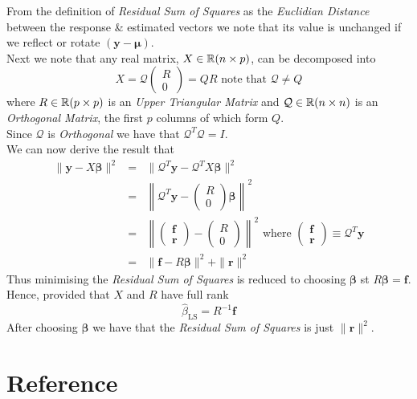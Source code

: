 \documentclass[11pt,a4paper]{article}
\begin{document}
From the definition of \textit{Residual Sum of Squares} as the \textit{Euclidian Distance} between the response \& estimated vectors we note that its value is unchanged if we reflect or rotate $(\textbf{y}-\pmb\mu)$.\\
Next we note that any real matrix, $X\in\mathbb{R}(n\times p)$, can be decomposed into
$$X=\mathcal{Q}\begin{pmatrix}R\\0\end{pmatrix}=QR\text{ note that }\mathcal{Q}\neq Q$$
where $R\in\mathbb{R}(p\times p)$ is an \textit{Upper Triangular Matrix} and $\mathcal{Q}\in\mathbb{R}(n\times n)$ is an \textit{Orthogonal Matrix}, the first $p$ columns of which form $Q$.\\
Since $\mathcal{Q}$ is \textit{Orthogonal} we have that $\mathcal{Q}^T\mathcal{Q}=I$.\\
We can now derive the result that
\[\begin{array}{rcl}
\|\textbf{y}-X\pmb\beta\|^2&=&\|\mathcal{Q}^T\textbf{y}-\mathcal{Q}^TX\pmb\beta\|^2\\
&=&\left\|\mathcal{Q}^T\textbf{y}-\begin{pmatrix}R\\0\end{pmatrix}\pmb\beta\right\|^2\\
&=&\left\|\begin{pmatrix}\textbf{f}\\\textbf{r}\end{pmatrix}-\begin{pmatrix}R\\0\end{pmatrix}\right\|^2\text{ where }\begin{pmatrix}\textbf{f}\\\textbf{r}\end{pmatrix}\equiv\mathcal{Q}^T\textbf{y}\\
&=&\|\textbf{f}-R\pmb\beta\|^2+\|\textbf{r}\|^2
\end{array}\]
Thus minimising the \textit{Residual Sum of Squares} is reduced to choosing $\pmb\beta$ st $R\pmb\beta=\textbf{f}$.\\
Hence, provided that $X$ and $R$ have full rank
$$\hat\beta_\text{LS}=R^{-1}\textbf{f}$$
\nb After choosing $\pmb\beta$ we have that the \textit{Residual Sum of Squares} is just $\|\textbf{r}\|^2$.

\newpage
\setcounter{section}{-1}
\section{Reference}
\end{document}
